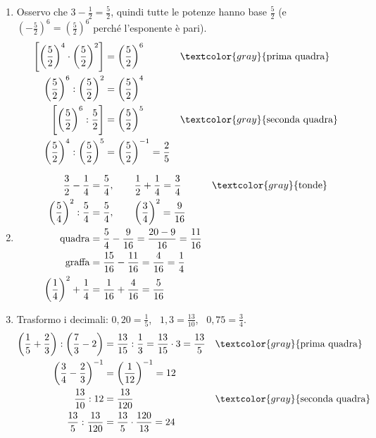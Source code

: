 \begin{question}[ID=2.1, subtitle={Calcolo di espressioni frazionarie — serie 1}, tags={espressioni, frazionarie}, difficulty=facile]
\begin{explanation}
\begin{enumerate}
\[\begin{aligned}
    \text{graffa} &= \dfrac16-\dfrac16+3-\dfrac56=\dfrac{13}{6}\\
    -\dfrac23-\dfrac{13}{6} &= -\dfrac46-\dfrac{13}{6}=-\dfrac{17}{6} && \textcolor{gray}{\text{denominatore comune $6$}}
    \end{aligned}\]
    \item Osservo che $3-\tfrac12=\tfrac52$, quindi tutte le potenze hanno base $\tfrac52$ (e $\left(-\tfrac52\right)^6=\left(\tfrac52\right)^6$ perché l'esponente è pari).
    \[\begin{aligned}
    \left[\left(\dfrac52\right)^4\cdot\left(\dfrac52\right)^2\right] &= \left(\dfrac52\right)^6 && \textcolor{gray}{\text{prima quadra}}\\
    \left(\dfrac52\right)^6:\left(\dfrac52\right)^2 &= \left(\dfrac52\right)^4\\
    \left[\left(\dfrac52\right)^6:\dfrac52\right] &= \left(\dfrac52\right)^5 && \textcolor{gray}{\text{seconda quadra}}\\
    \left(\dfrac52\right)^4:\left(\dfrac52\right)^5 &= \left(\dfrac52\right)^{-1}=\dfrac25
    \end{aligned}\]
    \item \[\begin{aligned}
    \dfrac32-\dfrac14 &= \dfrac54, \qquad \dfrac12+\dfrac14=\dfrac34 && \textcolor{gray}{\text{tonde}}\\
    \left(\dfrac54\right)^2:\dfrac54 &= \dfrac54, \qquad \left(\dfrac34\right)^2=\dfrac{9}{16}\\
    \text{quadra} &= \dfrac54-\dfrac9{16}=\dfrac{20-9}{16}=\dfrac{11}{16}\\
    \text{graffa} &= \dfrac{15}{16}-\dfrac{11}{16}=\dfrac4{16}=\dfrac14\\
    \left(\dfrac14\right)^2+\dfrac14 &= \dfrac1{16}+\dfrac4{16}=\dfrac5{16}
    \end{aligned}\]
    \item Trasformo i decimali: $0{,}20=\tfrac15$, \ $1{,}3=\tfrac{13}{10}$, \ $0{,}75=\tfrac34$.
    \[\begin{aligned}
    \left(\dfrac15+\dfrac23\right):\left(\dfrac73-2\right) &= \dfrac{13}{15}:\dfrac13=\dfrac{13}{15}\cdot3=\dfrac{13}{5} && \textcolor{gray}{\text{prima quadra}}\\
    \left(\dfrac34-\dfrac23\right)^{-1} &= \left(\dfrac1{12}\right)^{-1}=12\\
    \dfrac{13}{10}:12 &= \dfrac{13}{120} && \textcolor{gray}{\text{seconda quadra}}\\
    \dfrac{13}{5}:\dfrac{13}{120} &= \dfrac{13}{5}\cdot\dfrac{120}{13}=24

\end{aligned}\]
\end{enumerate}
\end{explanation}
\end{question}
